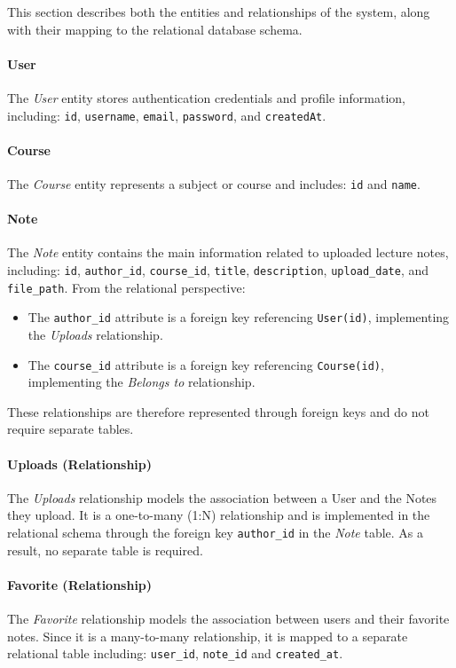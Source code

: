 This section describes both the entities and relationships of the system, along with their mapping to the relational database schema.

\paragraph{User}
The \textit{User} entity stores authentication credentials and profile information, including: \texttt{id}, \texttt{username}, \texttt{email}, \texttt{password}, and \texttt{createdAt}.

\paragraph{Course}
The \textit{Course} entity represents a subject or course and includes: \texttt{id} and \texttt{name}.

\paragraph{Note}
The \textit{Note} entity contains the main information related to uploaded lecture notes, including: \texttt{id}, \texttt{author\_id}, \texttt{course\_id}, \texttt{title}, \texttt{description}, \texttt{upload\_date}, and \texttt{file\_path}.
From the relational perspective:
\begin{itemize}
    \item The \texttt{author\_id} attribute is a foreign key referencing \texttt{User(id)}, implementing the \textit{Uploads} relationship.
    \item The \texttt{course\_id} attribute is a foreign key referencing \texttt{Course(id)}, implementing the \textit{Belongs to} relationship.
\end{itemize}

These relationships are therefore represented through foreign keys and do not require separate tables.

\paragraph{Uploads (Relationship)}
The \textit{Uploads} relationship models the association between a User and the Notes they upload. It is a one-to-many (1:N) relationship and is implemented in the relational schema through the foreign key \texttt{author\_id} in the \textit{Note} table. As a result, no separate table is required.

\paragraph{Favorite (Relationship)}
The \textit{Favorite} relationship models the association between users and their favorite notes. Since it is a many-to-many relationship, it is mapped to a separate relational table including: \texttt{user\_id}, \texttt{note\_id} and \texttt{created\_at}.

